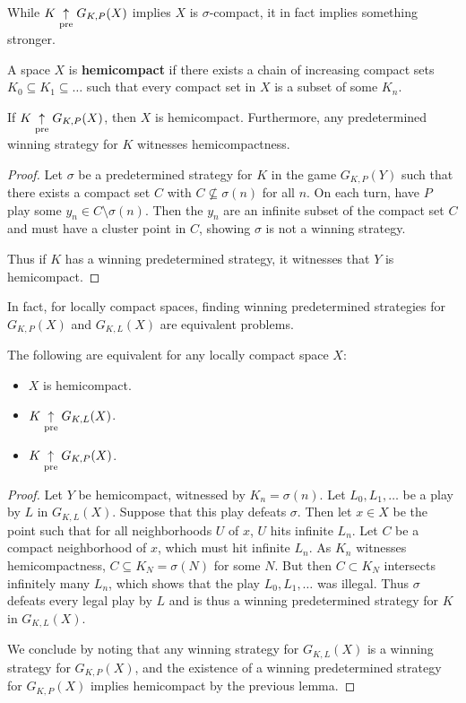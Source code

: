 While $K\underset{\text{pre}}{\uparrow} G_{K,P}(X)$ implies $X$ is $\sigma$-compact, it in fact implies something stronger.

\begin{definition}
A space $X$ is \textbf{hemicompact} if there exists a chain of increasing compact sets $K_0\subseteq K_1 \subseteq \dots$ such that every compact set in $X$ is a subset of some $K_n$.
\end{definition}

\begin{lemma}
If $K\underset{\text{pre}}{\uparrow} G_{K,P}(X)$, then $X$ is hemicompact. Furthermore, any predetermined winning strategy for $K$ witnesses hemicompactness.
\end{lemma}

\begin{proof}
Let $\sigma$ be a predetermined strategy for $K$ in the game $G_{K,P}(Y)$ such that there exists a compact set $C$ with $C \not\subseteq \sigma(n)$ for all $n$. On each turn, have $P$ play some $y_n\in C \setminus \sigma(n)$. Then the $y_n$ are an infinite subset of the compact set $C$ and must have a cluster point in $C$, showing $\sigma$ is not a winning strategy.

Thus if $K$ has a winning predetermined strategy, it witnesses that $Y$ is hemicompact.
\end{proof}

In fact, for locally compact spaces, finding winning predetermined strategies for $G_{K,P}(X)$ and $G_{K,L}(X)$ are equivalent problems.

\begin{theorem}
The following are equivalent for any locally compact space $X$:
  \begin{itemize}
  \item $X$ is hemicompact.
  \item $K \underset{\text{pre}}{\uparrow} G_{K,L}(X)$.
  \item $K \underset{\text{pre}}{\uparrow} G_{K,P}(X)$.
  \end{itemize}
\end{theorem}

\begin{proof}
Let $Y$ be hemicompact, witnessed by $K_n=\sigma(n)$. Let $L_0,L_1,\dots$ be a play by $L$ in $G_{K,L}(X)$. Suppose that this play defeats $\sigma$. Then let $x\in X$ be the point such that for all neighborhoods $U$ of $x$, $U$ hits infinite $L_n$. Let $C$ be a compact neighborhood of $x$, which must hit infinite $L_n$. As $K_n$ witnesses hemicompactness, $C \subseteq K_N = \sigma(N)$ for some $N$. But then $C\subset K_N$ intersects infinitely many $L_n$, which shows that the play $L_0,L_1,\dots$ was illegal. Thus $\sigma$ defeats every legal play by $L$ and is thus a winning predetermined strategy for $K$ in $G_{K,L}(X)$.

We conclude by noting that any winning strategy for $G_{K,L}(X)$ is a winning strategy for $G_{K,P}(X)$, and the existence of a winning predetermined strategy for $G_{K,P}(X)$ implies hemicompact by the previous lemma.
\end{proof}

